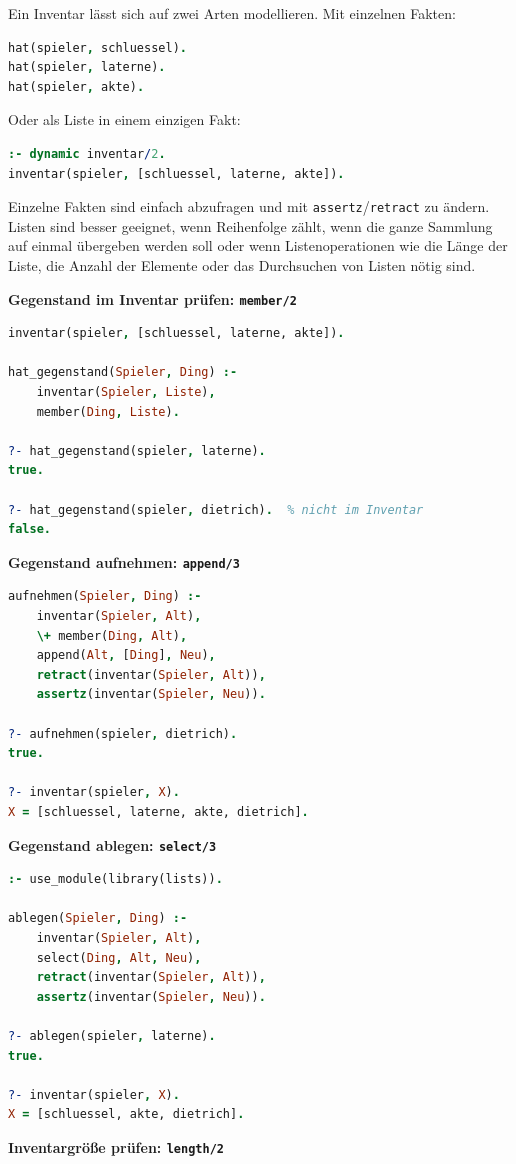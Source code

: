 \documentclass[parskip=half,a4paper,11pt]{scrreprt}
\begin{document}
Ein Inventar lässt sich auf zwei Arten modellieren. Mit einzelnen Fakten:

\begin{lstlisting}[language=Prolog, caption={}]
hat(spieler, schluessel).
hat(spieler, laterne).
hat(spieler, akte).
\end{lstlisting}
Oder als Liste in einem einzigen Fakt:

\begin{lstlisting}[language=Prolog, caption={}]
:- dynamic inventar/2.
inventar(spieler, [schluessel, laterne, akte]).
\end{lstlisting}
Einzelne Fakten sind einfach abzufragen und mit \texttt{assertz}/\texttt{retract} zu ändern. Listen sind besser geeignet, wenn Reihenfolge zählt, wenn die ganze Sammlung auf einmal übergeben werden soll oder wenn Listenoperationen wie die Länge der Liste, die Anzahl der Elemente oder das Durchsuchen von Listen nötig sind.

\textbf{Gegenstand im Inventar prüfen: \texttt{member/2}}

\begin{lstlisting}[language=Prolog, caption={}]
inventar(spieler, [schluessel, laterne, akte]).

hat_gegenstand(Spieler, Ding) :-
    inventar(Spieler, Liste),
    member(Ding, Liste).

?- hat_gegenstand(spieler, laterne).
true.

?- hat_gegenstand(spieler, dietrich).  % nicht im Inventar
false.
\end{lstlisting}

\textbf{Gegenstand aufnehmen: \texttt{append/3}}
\begin{lstlisting}[language=Prolog, caption={}]
aufnehmen(Spieler, Ding) :-
    inventar(Spieler, Alt),
    \+ member(Ding, Alt),
    append(Alt, [Ding], Neu),
    retract(inventar(Spieler, Alt)),
    assertz(inventar(Spieler, Neu)).

?- aufnehmen(spieler, dietrich).
true.

?- inventar(spieler, X).
X = [schluessel, laterne, akte, dietrich].
\end{lstlisting}

\textbf{Gegenstand ablegen: \texttt{select/3}}

\begin{lstlisting}[language=Prolog, caption={}]
:- use_module(library(lists)).

ablegen(Spieler, Ding) :-
    inventar(Spieler, Alt),
    select(Ding, Alt, Neu),
    retract(inventar(Spieler, Alt)),
    assertz(inventar(Spieler, Neu)).

?- ablegen(spieler, laterne).
true.

?- inventar(spieler, X).
X = [schluessel, akte, dietrich].
\end{lstlisting}
\textbf{Inventargröße prüfen: \texttt{length/2}}
\end{document}
